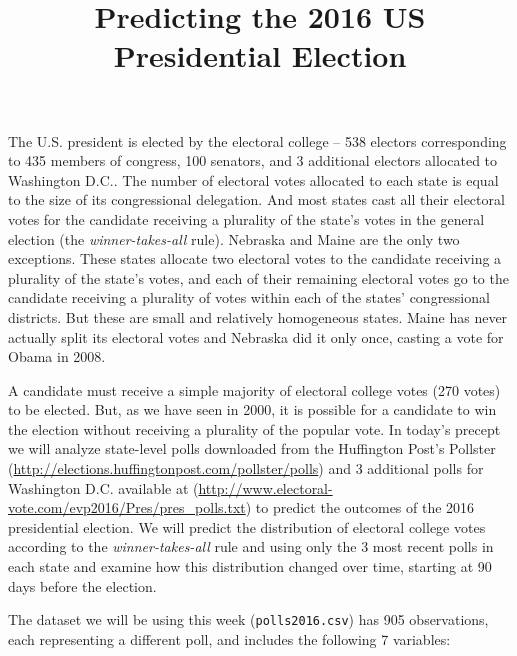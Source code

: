 \documentclass[]{article}
\title{Predicting the 2016 US Presidential Election}
\author{}
\date{}
\begin{document}
\maketitle


The U.S. president is elected by the electoral college -- 538 electors
corresponding to 435 members of congress, 100 senators, and 3 additional
electors allocated to Washington D.C.. The number of electoral votes
allocated to each state is equal to the size of its congressional
delegation. And most states cast all their electoral votes for the
candidate receiving a plurality of the state's votes in the general
election (the \emph{winner-takes-all} rule). Nebraska and Maine are the
only two exceptions. These states allocate two electoral votes to the
candidate receiving a plurality of the state's votes, and each of their
remaining electoral votes go to the candidate receiving a plurality of
votes within each of the states' congressional districts. But these are
small and relatively homogeneous states. Maine has never actually split
its electoral votes and Nebraska did it only once, casting a vote for
Obama in 2008.

A candidate must receive a simple majority of electoral college votes
(270 votes) to be elected. But, as we have seen in 2000, it is possible
for a candidate to win the election without receiving a plurality of the
popular vote. In today's precept we will analyze state-level polls
downloaded from the Huffington Post's Pollster
(\url{http://elections.huffingtonpost.com/pollster/polls}) and 3
additional polls for Washington D.C. available at
(\url{http://www.electoral-vote.com/evp2016/Pres/pres_polls.txt}) to
predict the outcomes of the 2016 presidential election. We will predict
the distribution of electoral college votes according to the
\emph{winner-takes-all} rule and using only the 3 most recent polls in
each state and examine how this distribution changed over time, starting
at 90 days before the election.

The dataset we will be using this week (\texttt{polls2016.csv}) has 905
observations, each representing a different poll, and includes the
following 7 variables:
\end{document}
